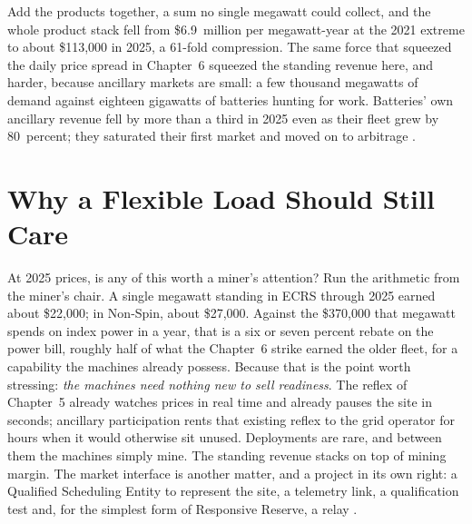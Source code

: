 Add the products together, a sum no single megawatt could collect, and the whole product stack fell from \$6.9~million per megawatt-year at the 2021 extreme to about \$113,000 in 2025, a 61-fold compression. %
The same force that squeezed the daily price spread in Chapter~6 squeezed the standing revenue here, and harder, because ancillary markets are small: a few thousand megawatts of demand against eighteen gigawatts of batteries hunting for work. Batteries' own ancillary revenue fell by more than a third in 2025 even as their fleet grew by 80~percent; they saturated their first market and moved on to arbitrage \autocite{potomac2026somercot}. %

\section{Why a Flexible Load Should Still Care}
\label{sec:as-why-care}

At 2025 prices, is any of this worth a miner's attention? Run the arithmetic from the miner's chair. A single megawatt standing in ECRS through 2025 earned about \$22,000; in Non-Spin, about \$27,000. %
Against the \$370,000 that megawatt spends on index power in a year, that is a six or seven percent rebate on the power bill, roughly half of what the Chapter~6 strike earned the older fleet, for a capability the machines already possess. %
Because that is the point worth stressing: \emph{the machines need nothing new to sell readiness}. The reflex of Chapter~5 already watches prices in real time and already pauses the site in seconds; ancillary participation rents that existing reflex to the grid operator for hours when it would otherwise sit unused. Deployments are rare, and between them the machines simply mine. The standing revenue stacks on top of mining margin.
The market interface is another matter, and a project in its own right: a Qualified Scheduling Entity to represent the site, a telemetry link, a qualification test and, for the simplest form of Responsive Reserve, a relay \autocite{ercot2026protocols}. %


